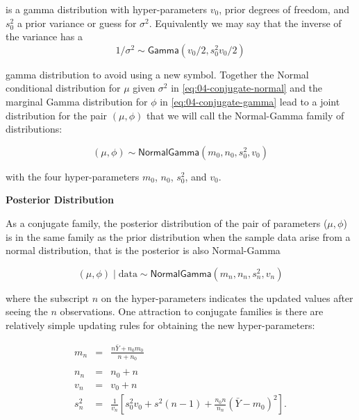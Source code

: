 \documentclass[]{book}
\theoremstyle{definition}
\theoremstyle{definition}
\theoremstyle{definition}
\theoremstyle{remark}
\begin{document}
is a gamma distribution with hyper-parameters \(v_0\), prior degrees of
freedom, and \(s^2_0\) a prior variance or guess for \(\sigma^2\).
Equivalently we may say that the inverse of the variance has a
\[1/\sigma^2 \sim \textsf{Gamma}(v_0/2, s^2_0 v_0/2)\]

gamma distribution to avoid using a new symbol. Together the Normal
conditional distribution for \(\mu\) given \(\sigma^2\) in
\eqref{eq:04-conjugate-normal} and the marginal Gamma distribution for
\(\phi\) in \eqref{eq:04-conjugate-gamma} lead to a joint distribution for
the pair \((\mu, \phi)\) that we will call the Normal-Gamma family of
distributions:

\begin{equation}(\mu, \phi) \sim \textsf{NormalGamma}(m_0, n_0, s^2_0, v_0)
\label{eq:04-conjugate-normal-gamma}
\end{equation}

with the four hyper-parameters \(m_0\), \(n_0\), \(s^2_0\), and \(v_0\).

\textbf{Posterior Distribution}

As a conjugate family, the posterior distribution of the pair of
parameters (\(\mu, \phi\)) is in the same family as the prior
distribution when the sample data arise from a normal distribution, that
is the posterior is also Normal-Gamma

\begin{equation}
(\mu, \phi) \mid \text{data} \sim \textsf{NormalGamma}(m_n, n_n, s^2_n, v_n)
\end{equation}

where the subscript \(n\) on the hyper-parameters indicates the updated
values after seeing the \(n\) observations. One attraction to conjugate
families is there are relatively simple updating rules for obtaining the
new hyper-parameters:

\begin{eqnarray*}
m_n & = & \frac{n \bar{Y} + n_0 m_0} {n + n_0}  \\
& \\
n_n & = & n_0 + n  \\
v_n & = & v_0 + n  \\
s^2_n & =  & \frac{1}{v_n}\left[s^2_0 v_0 + s^2 (n-1) + \frac{n_0 n}{n_n} (\bar{Y} - m_0)^2 \right]. 
\end{eqnarray*}
\end{document}
